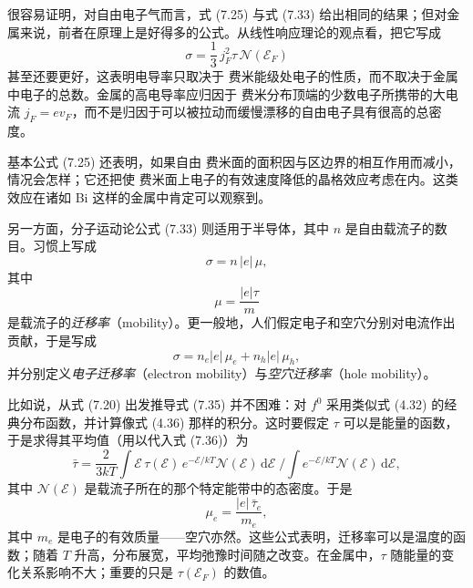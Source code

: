 很容易证明，对自由电子气而言，式 (7.25) 与式 (7.33) 给出相同的结果；但对金属来说，前者在原理上是好得多的公式。从线性响应理论的观点看，把它写成
\begin{equation*}
\sigma=\frac{1}{3}\,j_{F}^{2}\tau\,\mathcal{N}(\mathcal{E}_{F})\tag{7.34}
\end{equation*}
甚至还要更好，这表明电导率只取决于 费米能级处电子的性质，而不取决于金属中电子的总数。金属的高电导率应归因于 费米分布顶端的少数电子所携带的大电流 $j_{F}=ev_{F}$，而不是归因于可以被拉动而缓慢漂移的自由电子具有很高的总密度。

基本公式 (7.25) 还表明，如果自由 费米面的面积因与区边界的相互作用而减小，情况会怎样；它还把使 费米面上电子的有效速度降低的晶格效应考虑在内。这类效应在诸如 Bi 这样的金属中肯定可以观察到。

另一方面，分子运动论公式 (7.33) 则适用于半导体，其中 $n$ 是自由载流子的数目。习惯上写成
\begin{equation*}
\sigma=n\,|e|\,\mu,\tag{7.35}
\end{equation*}
其中
\begin{equation*}
\mu=\frac{|e|\tau}{m}\tag{7.36}
\end{equation*}
是载流子的\emph{迁移率}（mobility）。更一般地，人们假定电子和空穴分别对电流作出贡献，于是写成
\begin{equation*}
\sigma=n_{e}|e|\,\mu_{e}+n_{h}|e|\,\mu_{h},\tag{7.37}
\end{equation*}
并分别定义\emph{电子迁移率}（electron mobility）与\emph{空穴迁移率}（hole mobility）。

比如说，从式 (7.20) 出发推导式 (7.35) 并不困难：对 $f^{0}$ 采用类似式 (4.32) 的经典分布函数，并计算像式 (4.36) 那样的积分。这时要假定 $\tau$ 可以是能量的函数，于是求得其平均值（用以代入式 (7.36)）为
\begin{equation*}
\bar{\tau}=\frac{2}{3kT}\int\mathcal{E}\,\tau(\mathcal{E})\,e^{-\mathcal{E}/kT}\mathcal{N}(\mathcal{E})\,\mathrm{d}\mathcal{E}\;\bigg/\int e^{-\mathcal{E}/kT}\mathcal{N}(\mathcal{E})\,\mathrm{d}\mathcal{E},\tag{7.38}
\end{equation*}
其中 $\mathcal{N}(\mathcal{E})$ 是载流子所在的那个特定能带中的态密度。于是
\begin{equation*}
\mu_{e}=\frac{|e|\,\bar{\tau}_{e}}{m_{e}},\tag{7.39}
\end{equation*}
其中 $m_{e}$ 是电子的有效质量——空穴亦然。这些公式表明，迁移率可以是温度的函数；随着 $T$ 升高，分布展宽，平均弛豫时间随之改变。在金属中，$\tau$ 随能量的变化关系影响不大；重要的只是 $\tau(\mathcal{E}_{F})$ 的数值。

